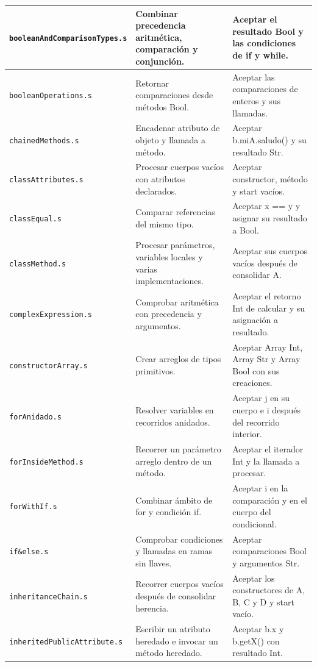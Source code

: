 \begin{longtable}{|>{\raggedright\arraybackslash}p{}|>{\raggedright\arraybackslash}p{}|>{\raggedright\arraybackslash}p{}|}
\texttt{boolean\allowbreak And\allowbreak Comparison\allowbreak Types.s} & Combinar precedencia aritmética, comparación y conjunción. & Aceptar el resultado Bool y las condiciones de if y while. \\ \hline
\texttt{boolean\allowbreak Operations.s} & Retornar comparaciones desde métodos Bool. & Aceptar las comparaciones de enteros y sus llamadas. \\ \hline
\texttt{chained\allowbreak Methods.s} & Encadenar atributo de objeto y llamada a método. & Aceptar b.miA.saludo() y su resultado Str. \\ \hline
\texttt{class\allowbreak Attributes.s} & Procesar cuerpos vacíos con atributos declarados. & Aceptar constructor, método y start vacíos. \\ \hline
\texttt{class\allowbreak Equal.s} & Comparar referencias del mismo tipo. & Aceptar x == y y asignar su resultado a Bool. \\ \hline
\texttt{class\allowbreak Method.s} & Procesar parámetros, variables locales y varias implementaciones. & Aceptar sus cuerpos vacíos después de consolidar A. \\ \hline
\texttt{complex\allowbreak Expression.s} & Comprobar aritmética con precedencia y argumentos. & Aceptar el retorno Int de calcular y su asignación a resultado. \\ \hline
\texttt{constructor\allowbreak Array.s} & Crear arreglos de tipos primitivos. & Aceptar Array Int, Array Str y Array Bool con sus creaciones. \\ \hline
\texttt{for\allowbreak Anidado.s} & Resolver variables en recorridos anidados. & Aceptar j en su cuerpo e i después del recorrido interior. \\ \hline
\texttt{for\allowbreak Inside\allowbreak Method.s} & Recorrer un parámetro arreglo dentro de un método. & Aceptar el iterador Int y la llamada a procesar. \\ \hline
\texttt{for\allowbreak With\allowbreak If.s} & Combinar ámbito de for y condición if. & Aceptar i en la comparación y en el cuerpo del condicional. \\ \hline
\texttt{if\&else.s} & Comprobar condiciones y llamadas en ramas sin llaves. & Aceptar comparaciones Bool y argumentos Str. \\ \hline
\texttt{inheritance\allowbreak Chain.s} & Recorrer cuerpos vacíos después de consolidar herencia. & Aceptar los constructores de A, B, C y D y start vacío. \\ \hline
\texttt{inherited\allowbreak Public\allowbreak Attribute.s} & Escribir un atributo heredado e invocar un método heredado. & Aceptar b.x y b.getX() con resultado Int. \\ \hline

\end{longtable}
